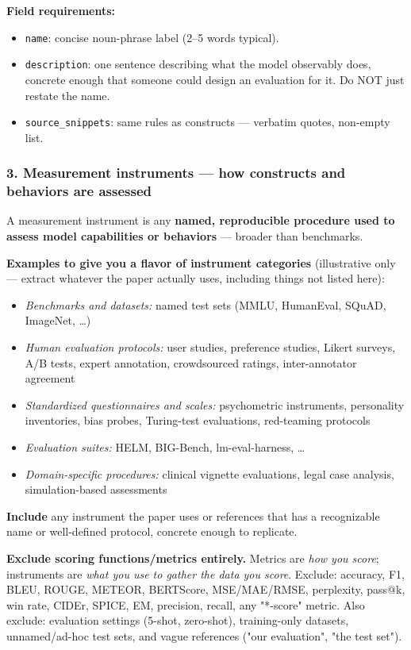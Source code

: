 \begin{tcolorbox}[breakable,enhanced,colback=blue!3,colframe=blue!40!black,title={Prompt},fonttitle=\bfseries,left=8pt,right=8pt,top=6pt,bottom=6pt]
\textbf{Field requirements:}
\begin{itemize}
\item \texttt{name}: concise noun-phrase label (2--5 words typical).
\item \texttt{description}: one sentence describing what the model observably does, concrete enough that someone could design an evaluation for it. Do NOT just restate the name.
\item \texttt{source\_snippets}: same rules as constructs --- verbatim quotes, non-empty list.
\end{itemize}

\subsubsection*{3. Measurement instruments --- how constructs and behaviors are assessed}

A measurement instrument is any \textbf{named, reproducible procedure used to assess model capabilities or behaviors} --- broader than benchmarks.

\textbf{Examples to give you a flavor of instrument categories} (illustrative only --- extract whatever the paper actually uses, including things not listed here):
\begin{itemize}
\item \textit{Benchmarks and datasets:} named test sets (MMLU, HumanEval, SQuAD, ImageNet, \dots )
\item \textit{Human evaluation protocols:} user studies, preference studies, Likert surveys, A/B tests, expert annotation, crowdsourced ratings, inter-annotator agreement
\item \textit{Standardized questionnaires and scales:} psychometric instruments, personality inventories, bias probes, Turing-test evaluations, red-teaming protocols
\item \textit{Evaluation suites:} HELM, BIG-Bench, lm-eval-harness, \dots 
\item \textit{Domain-specific procedures:} clinical vignette evaluations, legal case analysis, simulation-based assessments
\end{itemize}

\textbf{Include} any instrument the paper uses or references that has a recognizable name or well-defined protocol, concrete enough to replicate.

\textbf{Exclude scoring functions/metrics entirely.} Metrics are \textit{how you score}; instruments are \textit{what you use to gather the data you score}. Exclude: accuracy, F1, BLEU, ROUGE, METEOR, BERTScore, MSE/MAE/RMSE, perplexity, pass@k, win rate, CIDEr, SPICE, EM, precision, recall, any "*-score" metric. Also exclude: evaluation settings (5-shot, zero-shot), training-only datasets, unnamed/ad-hoc test sets, and vague references ("our evaluation", "the test set").


\end{tcolorbox}
